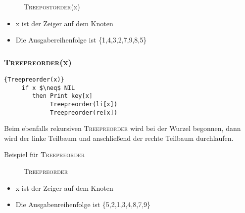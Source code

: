 \documentclass[ngerman,draft,parskip=half*,twoside]{scrreprt}
\theoremstyle{break}
\theoremstyle{nonumberbreak}
\begin{document}
  \begin{figure}[H]
  \centering  
   \caption{\textsc{Treepostorder}(x)}
   \label{171103b}
  \end{figure}
  \begin{itemize}
   \item x ist der Zeiger auf dem Knoten
   \item Die Ausgabereihenfolge ist \{1,4,3,2,7,9,8,5\}
  \end{itemize}
 
 \subsubsection{\textsc{Treepreorder}(x)}
   \begin{Algorithmus}[H]   
    \begin{lstlisting}[frame=tlrb, mathescape=true, title=\textsc{Treepreorder\textnormal{(x)}}, gobble=4]{Treepreorder(x)}
     if x $\neq$ NIL
        then Print key[x]
             Treepreorder(li[x])
             Treepreorder(re[x])
    \end{lstlisting}

   Beim ebenfalls rekursiven \textsc{Treepreorder} wird bei der Wurzel begonnen, dann wird der 
   linke Teilbaum und anschließend der rechte Teilbaum durchlaufen.
   \end{Algorithmus}
Beispiel für \textsc{Treepreorder}
   
  \begin{figure}[H]
  \centering  
   \caption{\textsc{Treepreorder }}
   \label{171103c}
  \end{figure}
 \begin{itemize}
  \item x ist der Zeiger auf dem Knoten
  \item Die Ausgabenreihenfolge ist \{5,2,1,3,4,8,7,9\}
 \end{itemize}
 
\end{document}
